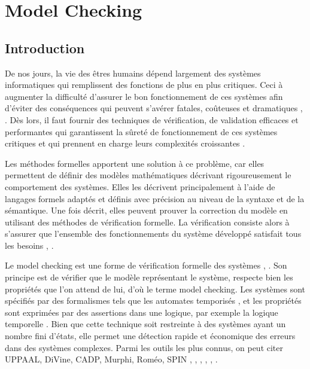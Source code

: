 \chapter{Model Checking}\label{chapmc}

\section{Introduction} 
De nos jours, la vie des êtres humains dépend largement des systèmes informatiques qui remplissent des fonctions de plus en plus critiques. Ceci à augmenter la difficulté d'assurer le bon fonctionnement de ces systèmes afin d'éviter des conséquences qui peuvent s'avérer fatales, coûteuses et dramatiques \citep{Huckle2015}, \citep{Kanaracus2012}. Dès lors, il faut fournir des techniques de vérification, de validation efficaces et performantes qui garantissent la sûreté de fonctionnement de ces systèmes critiques et qui prennent en charge leurs complexités croissantes \citep{Ferrari1978}.

Les méthodes formelles apportent une solution à ce problème, car elles permettent de définir des modèles mathématiques décrivant  rigoureusement le comportement des systèmes. Elles les décrivent principalement à l'aide de langages formels adaptés et définis avec précision au niveau de la syntaxe et de la sémantique. Une fois décrit, elles peuvent prouver la correction du modèle en utilisant des méthodes de vérification formelle. La vérification consiste alors à s'assurer que l'ensemble des fonctionnements du système développé satisfait tous les besoins \citep{ClarkeWing1996}, \citep{Dsilva2008}.
 
Le model checking est une forme de vérification formelle des systèmes \citep{Cheng2006}, \citep{Wang2004}. Son principe est de vérifier que le modèle représentant le système, respecte bien les propriétés que l'on attend de lui, d'où le terme model checking. Les systèmes sont spécifiés par des formalismes tels que les automates temporisés \citep{AlurDill1994}, et les propriétés sont exprimées par des assertions dans une logique, par exemple la logique temporelle \citep{BenAri1983}. Bien que cette technique soit restreinte à des systèmes ayant un nombre fini d'états, elle permet une détection rapide et économique des erreurs dans des systèmes complexes. Parmi les outils les plus connus, on peut citer UPPAAL, DiVine, CADP, Murphi, Roméo, SPIN \citep{Behrmann2004}, \citep{Barnat2010}, \citep{Garavel2013}, \citep{Dill1996}, \citep{Lime2009}, \citep{Holzmann2003}.

